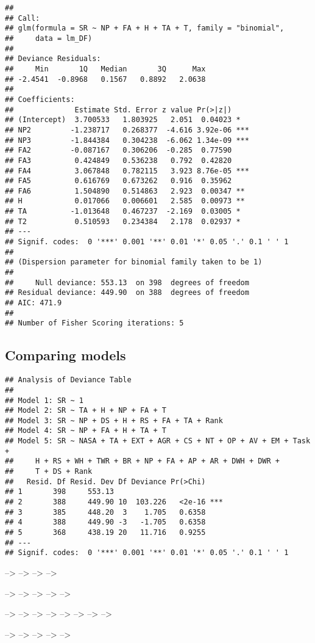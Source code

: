 \documentclass[]{article}
\begin{document}
\begin{verbatim}
## 
## Call:
## glm(formula = SR ~ NP + FA + H + TA + T, family = "binomial", 
##     data = lm_DF)
## 
## Deviance Residuals: 
##     Min       1Q   Median       3Q      Max  
## -2.4541  -0.8968   0.1567   0.8892   2.0638  
## 
## Coefficients:
##              Estimate Std. Error z value Pr(>|z|)    
## (Intercept)  3.700533   1.803925   2.051  0.04023 *  
## NP2         -1.238717   0.268377  -4.616 3.92e-06 ***
## NP3         -1.844384   0.304238  -6.062 1.34e-09 ***
## FA2         -0.087167   0.306206  -0.285  0.77590    
## FA3          0.424849   0.536238   0.792  0.42820    
## FA4          3.067848   0.782115   3.923 8.76e-05 ***
## FA5          0.616769   0.673262   0.916  0.35962    
## FA6          1.504890   0.514863   2.923  0.00347 ** 
## H            0.017066   0.006601   2.585  0.00973 ** 
## TA          -1.013648   0.467237  -2.169  0.03005 *  
## T2           0.510593   0.234384   2.178  0.02937 *  
## ---
## Signif. codes:  0 '***' 0.001 '**' 0.01 '*' 0.05 '.' 0.1 ' ' 1
## 
## (Dispersion parameter for binomial family taken to be 1)
## 
##     Null deviance: 553.13  on 398  degrees of freedom
## Residual deviance: 449.90  on 388  degrees of freedom
## AIC: 471.9
## 
## Number of Fisher Scoring iterations: 5
\end{verbatim}

\newpage

\hypertarget{comparing-models-2}{%
\subsection{Comparing models}\label{comparing-models-2}}

\begin{verbatim}
## Analysis of Deviance Table
## 
## Model 1: SR ~ 1
## Model 2: SR ~ TA + H + NP + FA + T
## Model 3: SR ~ NP + DS + H + RS + FA + TA + Rank
## Model 4: SR ~ NP + FA + H + TA + T
## Model 5: SR ~ NASA + TA + EXT + AGR + CS + NT + OP + AV + EM + Task + 
##     H + RS + WH + TWR + BR + NP + FA + AP + AR + DWH + DWR + 
##     T + DS + Rank
##   Resid. Df Resid. Dev Df Deviance Pr(>Chi)    
## 1       398     553.13                         
## 2       388     449.90 10  103.226   <2e-16 ***
## 3       385     448.20  3    1.705   0.6358    
## 4       388     449.90 -3   -1.705   0.6358    
## 5       368     438.19 20   11.716   0.9255    
## ---
## Signif. codes:  0 '***' 0.001 '**' 0.01 '*' 0.05 '.' 0.1 ' ' 1
\end{verbatim}

--\textgreater{} --\textgreater{} --\textgreater{} --\textgreater{}

--\textgreater{} --\textgreater{} --\textgreater{} --\textgreater{}
--\textgreater{}

--\textgreater{} --\textgreater{} --\textgreater{} --\textgreater{}
--\textgreater{} --\textgreater{} --\textgreater{} --\textgreater{}

--\textgreater{} --\textgreater{} --\textgreater{} --\textgreater{}
--\textgreater{}
\end{document}
